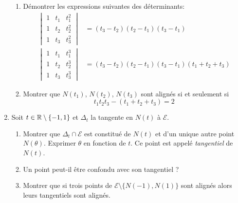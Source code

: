 \begin{enumerate}
\begin{enumerate}
 \item Démontrer les expressions suivantes des déterminants:
\begin{align*}
 \begin{vmatrix}
  1 & t_1 & t_1^2 \\ 1 & t_2 & t_2^2 \\ 1 & t_3 & t_3^2 
 \end{vmatrix}
&= (t_3-t_2)(t_2-t_1)(t_3-t_1) \\
 \begin{vmatrix}
  1 & t_1 & t_1^3 \\ 1 & t_2 & t_2^3 \\ 1 & t_3 & t_3^3 
 \end{vmatrix}
&= (t_3-t_2)(t_2-t_1)(t_3-t_1)(t_1+t_2+t_3)
\end{align*}

 \item  Montrer que $N(t_1)$, $N(t_2)$, $N(t_3)$ sont alignés si et seulement si
\begin{displaymath}
 t_1t_2t_3 - (t_1+t_2+t_3)= 2
\end{displaymath}
\end{enumerate}

\item Soit $t\in \mathbb{R}\setminus\{-1,1\}$ et $\Delta_t$ la tangente en $N(t)$ à $\mathcal{E}$.
\begin{enumerate}
 \item Montrer que $\Delta_{t}\cap \mathcal{E}$ est constitué de $N(t)$ et d'un unique autre point $N(\theta)$. Exprimer $\theta$ en fonction de $t$. Ce point est appelé \emph{tangentiel} de $N(t)$.
 \item Un point peut-il être confondu avec son tangentiel ?
 \item Montrer que si trois points de $\mathcal{E}\setminus\{N(-1),N(1)\}$ sont alignés alors leurs tangentiels sont alignés.
\end{enumerate}
 
\end{enumerate}

